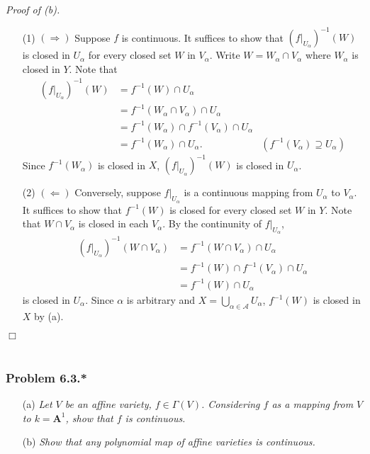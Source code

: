 \documentclass{article}
\begin{document}
\emph{Proof of (b).}
\begin{enumerate}
\item[(1)]
  $(\Longrightarrow)$
  Suppose $f$ is continuous.
  It suffices to show that
  $(f|_{U_{\alpha}})^{-1}(W)$ is closed in $U_{\alpha}$ for every closed set $W$ in $V_{\alpha}$.
  Write $W = W_{\alpha} \cap V_{\alpha}$ where $W_{\alpha}$ is closed in $Y$.
  Note that
  \begin{align*}
    (f|_{U_{\alpha}})^{-1}(W)
    &= f^{-1}(W) \cap U_{\alpha} \\
    &= f^{-1}(W_{\alpha} \cap V_{\alpha}) \cap U_{\alpha} \\
    &= f^{-1}(W_{\alpha}) \cap f^{-1}(V_{\alpha}) \cap U_{\alpha} \\
    &= f^{-1}(W_{\alpha}) \cap U_{\alpha}.
      &(f^{-1}(V_{\alpha}) \supseteq U_{\alpha})
  \end{align*}
  Since $f^{-1}(W_{\alpha})$ is closed in $X$,
  $(f|_{U_{\alpha}})^{-1}(W)$ is closed in $U_{\alpha}$.

\item[(2)]
  $(\Longleftarrow)$
  Conversely, suppose $f|_{U_{\alpha}}$ is a continuous mapping from $U_{\alpha}$ to $V_{\alpha}$.
  It suffices to show that
  $f^{-1}(W)$ is closed for every closed set $W$ in $Y$.
  Note that $W \cap V_{\alpha}$ is closed in each $V_{\alpha}$.
  By the continunity of $f|_{U_{\alpha}}$,
  \begin{align*}
    (f|_{U_{\alpha}})^{-1}(W \cap V_{\alpha})
    &= f^{-1}(W \cap V_{\alpha}) \cap U_{\alpha} \\
    &= f^{-1}(W) \cap f^{-1}(V_{\alpha}) \cap U_{\alpha} \\
    &= f^{-1}(W) \cap U_{\alpha}
  \end{align*}
  is closed in $U_{\alpha}$.
  Since $\alpha$ is arbitrary and $X = \bigcup_{\alpha \in \mathscr{A}} U_{\alpha}$,
  $f^{-1}(W)$ is closed in $X$ by (a).
\end{enumerate}
$\Box$ \\\\






\subsubsection*{Problem 6.3.*}
\begin{enumerate}
\item[(a)]
  \emph{Let $V$ be an affine variety, $f \in \Gamma(V)$.
  Considering $f$ as a mapping from $V$ to $k = \mathbf{A}^{1}$,
  show that $f$ is continuous.}

\item[(b)]
  \emph{Show that any polynomial map of affine varieties is continuous.} \\
\end{enumerate}
\end{document}
